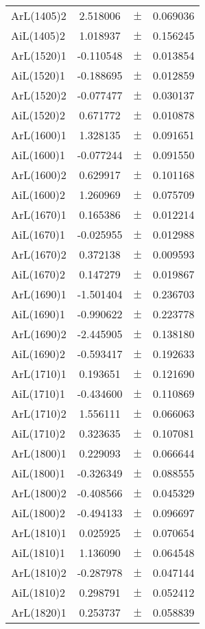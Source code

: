 \begin{table}
\begin{tiny}
\begin{tabular}{lccc}
ArL(1405)2 & 2.518006 & $\pm$ & 0.069036 \\
AiL(1405)2 & 1.018937 & $\pm$ & 0.156245 \\
ArL(1520)1 & -0.110548 & $\pm$ & 0.013854 \\
AiL(1520)1 & -0.188695 & $\pm$ & 0.012859 \\
ArL(1520)2 & -0.077477 & $\pm$ & 0.030137 \\
AiL(1520)2 & 0.671772 & $\pm$ & 0.010878 \\
ArL(1600)1 & 1.328135 & $\pm$ & 0.091651 \\
AiL(1600)1 & -0.077244 & $\pm$ & 0.091550 \\
ArL(1600)2 & 0.629917 & $\pm$ & 0.101168 \\
AiL(1600)2 & 1.260969 & $\pm$ & 0.075709 \\
ArL(1670)1 & 0.165386 & $\pm$ & 0.012214 \\
AiL(1670)1 & -0.025955 & $\pm$ & 0.012988 \\
ArL(1670)2 & 0.372138 & $\pm$ & 0.009593 \\
AiL(1670)2 & 0.147279 & $\pm$ & 0.019867 \\
ArL(1690)1 & -1.501404 & $\pm$ & 0.236703 \\
AiL(1690)1 & -0.990622 & $\pm$ & 0.223778 \\
ArL(1690)2 & -2.445905 & $\pm$ & 0.138180 \\
AiL(1690)2 & -0.593417 & $\pm$ & 0.192633 \\
ArL(1710)1 & 0.193651 & $\pm$ & 0.121690 \\
AiL(1710)1 & -0.434600 & $\pm$ & 0.110869 \\
ArL(1710)2 & 1.556111 & $\pm$ & 0.066063 \\
AiL(1710)2 & 0.323635 & $\pm$ & 0.107081 \\
ArL(1800)1 & 0.229093 & $\pm$ & 0.066644 \\
AiL(1800)1 & -0.326349 & $\pm$ & 0.088555 \\
ArL(1800)2 & -0.408566 & $\pm$ & 0.045329 \\
AiL(1800)2 & -0.494133 & $\pm$ & 0.096697 \\
ArL(1810)1 & 0.025925 & $\pm$ & 0.070654 \\
AiL(1810)1 & 1.136090 & $\pm$ & 0.064548 \\
ArL(1810)2 & -0.287978 & $\pm$ & 0.047144 \\
AiL(1810)2 & 0.298791 & $\pm$ & 0.052412 \\
ArL(1820)1 & 0.253737 & $\pm$ & 0.058839 \\

\end{tabular}
\end{tiny}
\end{table}
